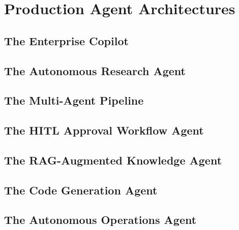 
\part{Production Agent Architectures}
\label{part:production-architectures}

\chapter{The Enterprise Copilot}
\label{ch:enterprise-copilot}


\chapter{The Autonomous Research Agent}
\label{ch:research-agent}


\chapter{The Multi-Agent Pipeline}
\label{ch:multi-agent-pipeline}


\chapter{The HITL Approval Workflow Agent}
\label{ch:hitl-workflow}


\chapter{The RAG-Augmented Knowledge Agent}
\label{ch:rag-knowledge-agent}


\chapter{The Code Generation Agent}
\label{ch:code-generation-agent}


\chapter{The Autonomous Operations Agent}
\label{ch:operations-agent}



